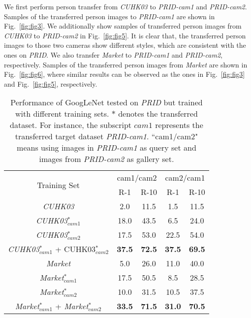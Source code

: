 \documentclass[10pt,twocolumn,letterpaper]{article}
\begin{document}
We first perform person transfer from \emph{CUHK03} to \emph{PRID-cam1} and \emph{PRID-cam2}. Samples of the transferred person images to \emph{PRID-cam1} are shown in Fig.~\ref{fig:fig3}. We additionally show samples of transferred person images from \emph{CUHK03} to \emph{PRID-cam2} in Fig.~\ref{fig:fig5}. It is clear that, the transferred person images to those two cameras show different styles, which are consistent with the ones on \emph{PRID}. We also transfer \emph{Market} to \emph{PRID-cam1} and \emph{PRID-cam2}, respectively. Samples of the transferred person images from \emph{Market} are shown in Fig.~\ref{fig:fig6}, where similar results can be observed as the ones in Fig.~\ref{fig:fig3} and Fig.~\ref{fig:fig5}, respectively.

\captionsetup{belowskip=-0cm}
\captionsetup{aboveskip=0.1cm}
\begin{table}

\footnotesize
\begin{center}
\caption{Performance of GoogLeNet tested on \emph{PRID} but trained with different training sets. $*$ denotes the transferred dataset. For instance, the subscript ${cam1}$ represents the transferred target dataset \emph{PRID-cam1}. ``cam1/cam2" means using images in \emph{PRID-cam1} as query set and images from \emph{PRID-cam2} as gallery set. }\label{tab:tab2}
\begin{tabular}{c|c|c|c|c}
\hline
\multirow{2}{*}{Training Set}       &\multicolumn{2}{c|}{cam1/cam2}&\multicolumn{2}{c}{cam2/cam1} \\

 \cline{2-5} &R-1&R-10        &R-1&R-10\\

\hline
\hline

\emph{CUHK03}     &2.0&11.5 &1.5&11.5\\
\emph{CUHK03}$^{*}_{cam1}$       &18.0&43.5 &6.5&24.0\\
\emph{CUHK03}$^{*}_{cam2}$        &17.5&53.0 &22.5&54.0\\
\emph{CUHK03}$^{*}_{cam1}$  +  CUHK03$^{*}_{cam2}$       &\textbf{37.5}&\textbf{72.5} &\textbf{37.5}&\textbf{69.5}\\
\hline

\emph{Market}     &5.0&26.0 &11.0&40.0\\
\emph{Market}$^{*}_{cam1}$        &17.5&50.5 &8.5&28.5\\
\emph{Market}$^{*}_{cam2}$       &10.0&31.5 &10.5&37.5\\
\emph{Market}$^{*}_{cam1}$  +  \emph{Market}$^{*}_{cam2}$       &\textbf{33.5}&\textbf{71.5} &\textbf{31.0}&\textbf{70.5}\\
\hline
\end{tabular}
\end{center}
\end{table}
\end{document}
